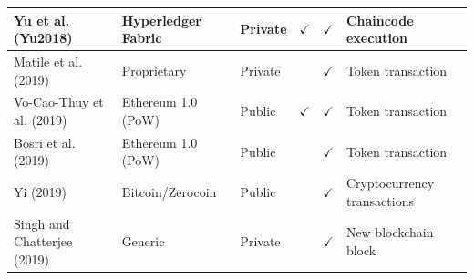 \documentclass[../access.tex]{subfiles}
\begin{document}
\begin{table}[htbp]
\begin{adjustwidth}{-2cm}{}
\begin{tabular}{m{4.4cm} >{\centering\arraybackslash}m{2.9cm} >{\centering\arraybackslash}m{1.0cm} >{\centering\arraybackslash}m{1.0cm} >{\centering\arraybackslash}m{1.5cm} >{\centering\arraybackslash}m{3.6cm}}
                    \hline
                    \footnotesize{Yu et al. (Yu2018) \cite{Yu2018}} & \footnotesize{Hyperledger Fabric} & \footnotesize{Private} & $ \checkmark $ & $ \checkmark $ & \footnotesize{Chaincode execution} \\
                    \hline
                    \footnotesize{Matile et al. (2019) \cite{Matile2019}} & \footnotesize{Proprietary} & \footnotesize{Private} & {} & $ \checkmark $ & \footnotesize{Token transaction} \\
                    \hline
                    \footnotesize{Vo-Cao-Thuy et al. (2019) \cite{Vo-Cao-Thuy2019}} & \footnotesize{Ethereum 1.0 (PoW)} & \footnotesize{Public} & $ \checkmark $ & $ \checkmark $ & \footnotesize{Token transaction} \\
                    \hline
                    \footnotesize{Bosri et al. (2019) \cite{Bosri2019}} & \footnotesize{Ethereum 1.0 (PoW)} & \footnotesize{Public} & {} & $ \checkmark $ & \footnotesize{Token transaction} \\
                    \hline
                    \footnotesize{Yi (2019) \cite{Yi2019}} & \footnotesize{Bitcoin/Zerocoin} & \footnotesize{Public} & {} & $ \checkmark $ & \footnotesize{Cryptocurrency transactions} \\
                    \hline
                    \footnotesize{Singh and Chatterjee (2019) \cite{Singh2019}} & \footnotesize{Generic} & \footnotesize{Private} & {} & $ \checkmark $ & \footnotesize{New blockchain block} \\
                    \bottomrule
                \end{tabular}
            \end{adjustwidth}
        \label{tbl:table6}
    \end{table}
\end{document}
